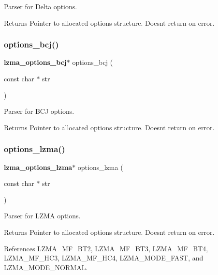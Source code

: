 Parser for Delta options. 

\begin{DoxyReturn}{Returns}
Pointer to allocated options structure. Doesn\textquotesingle{}t return on error. 
\end{DoxyReturn}
\mbox{\label{options_8h_a90111e8a8652cc28be7ca9763ed588d5}} 
\subsubsection{options\+\_\+bcj()}
{\footnotesize\ttfamily \textbf{ lzma\+\_\+options\+\_\+bcj}$\ast$ options\+\_\+bcj (\begin{DoxyParamCaption}\item[{const char $\ast$}]{str }\end{DoxyParamCaption})}



Parser for B\+CJ options. 

\begin{DoxyReturn}{Returns}
Pointer to allocated options structure. Doesn\textquotesingle{}t return on error. 
\end{DoxyReturn}
\mbox{\label{options_8h_a80e4a9dd89d3f2fab00c48c4feb75126}} 
\subsubsection{options\+\_\+lzma()}
{\footnotesize\ttfamily \textbf{ lzma\+\_\+options\+\_\+lzma}$\ast$ options\+\_\+lzma (\begin{DoxyParamCaption}\item[{const char $\ast$}]{str }\end{DoxyParamCaption})}



Parser for L\+Z\+MA options. 

\begin{DoxyReturn}{Returns}
Pointer to allocated options structure. Doesn\textquotesingle{}t return on error. 
\end{DoxyReturn}


References L\+Z\+M\+A\+\_\+\+M\+F\+\_\+\+B\+T2, L\+Z\+M\+A\+\_\+\+M\+F\+\_\+\+B\+T3, L\+Z\+M\+A\+\_\+\+M\+F\+\_\+\+B\+T4, L\+Z\+M\+A\+\_\+\+M\+F\+\_\+\+H\+C3, L\+Z\+M\+A\+\_\+\+M\+F\+\_\+\+H\+C4, L\+Z\+M\+A\+\_\+\+M\+O\+D\+E\+\_\+\+F\+A\+ST, and L\+Z\+M\+A\+\_\+\+M\+O\+D\+E\+\_\+\+N\+O\+R\+M\+AL.

